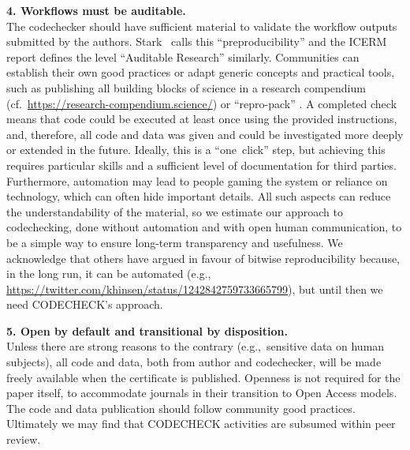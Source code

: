 \documentclass[12pt]{article}
\begin{document}
\textbf{4. Workflows must be auditable.} \\
The codechecker should have sufficient material to validate the
workflow outputs submitted by the
authors. Stark~\cite{stark_before_2018} calls this
``preproducibility'' and the ICERM report \cite{stodden_setting_2013}
defines the level ``Auditable Research'' similarly.  Communities can
establish their own good practices or adapt generic concepts and
practical tools, such as publishing all building blocks of science in
a research compendium (cf.~\url{https://research-compendium.science/})
or ``repro-pack'' \cite{barba_praxis_2018}.  A completed check means
that code could be executed at least once using the provided
instructions, and, therefore, all code and data was given and could be
investigated more deeply or extended in the future.  Ideally, this is
a ``one~click'' step, but achieving this requires particular skills
and a sufficient level of documentation for third
parties. Furthermore, automation may lead to people gaming the system
or reliance on technology, which can often hide important details.
All such aspects can reduce the understandability of the material, so
we estimate our approach to codechecking, done without automation and
with open human communication, to be a simple way to ensure long-term
transparency and usefulness.  We acknowledge that others have argued
in favour of bitwise reproducibility because, in the long run, it can
be automated (e.g.,
\url{https://twitter.com/khinsen/status/1242842759733665799}), but
until then we need CODECHECK's approach.

\textbf{5. Open by default and transitional by disposition.} \\
Unless there are strong reasons to the contrary
(e.g.,~sensitive data on human subjects), all code and data, both from
author and codechecker, will be made freely available when
the certificate is published.  Openness is not required for the paper
itself, to accommodate journals in their transition to
Open Access models.  The code and data publication should follow
community good practices.  Ultimately we may find that CODECHECK activities are
subsumed within peer review.
\end{document}
